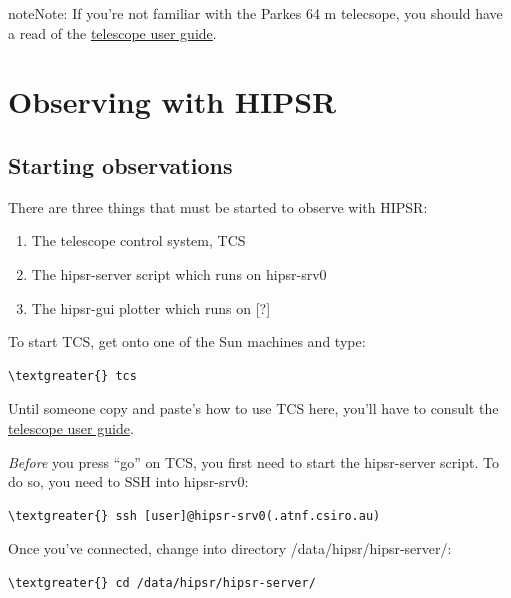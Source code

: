 \documentclass[letterpaper,10pt,english]{sphinxmanual}
\begin{document}
\begin{notice}{note}{Note:}
If you're not familiar with the Parkes 64 m telecsope, you should have a read of
the \href{http://www.parkes.atnf.csiro.au/observing/documentation/user\_guide/}{telescope user guide}.
\end{notice}


\section{Observing with HIPSR}
\label{user_guide:observing-with-hipsr}

\subsection{Starting observations}
\label{user_guide:starting-observations}
There are three things that must be started to observe with HIPSR:
\begin{enumerate}
\item {} 
The telescope control system, TCS

\item {} 
The hipsr-server script which runs on hipsr-srv0

\item {} 
The hipsr-gui plotter which runs on {[}?{]}

\end{enumerate}

To start TCS, get onto one of the Sun machines and type:

\begin{Verbatim}[commandchars=\\\{\}]
\textgreater{} tcs
\end{Verbatim}

Until someone copy and paste's how to use TCS here, you'll have to consult the \href{http://www.parkes.atnf.csiro.au/observing/documentation/user\_guide/}{telescope user guide}.

\emph{Before} you press ``go'' on TCS, you first need to start the hipsr-server script. To do so,
you need to SSH into hipsr-srv0:

\begin{Verbatim}[commandchars=\\\{\}]
\textgreater{} ssh [user]@hipsr-srv0(.atnf.csiro.au)
\end{Verbatim}

Once you've connected, change into directory /data/hipsr/hipsr-server/:

\begin{Verbatim}[commandchars=\\\{\}]
\textgreater{} cd /data/hipsr/hipsr-server/
\end{Verbatim}
\end{document}
